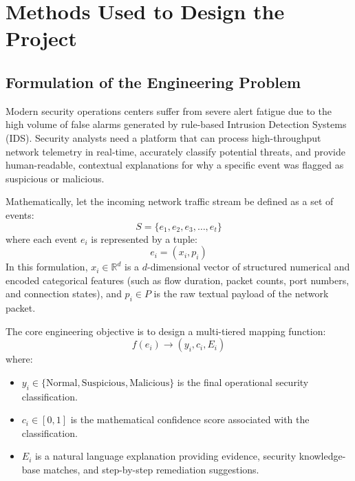 \documentclass[12pt,a4paper]{report}
\begin{document}
\chapter{Methods Used to Design the Project}

\section{Formulation of the Engineering Problem}

Modern security operations centers suffer from severe alert fatigue due to the high volume of false alarms generated by rule-based Intrusion Detection Systems (IDS). Security analysts need a platform that can process high-throughput network telemetry in real-time, accurately classify potential threats, and provide human-readable, contextual explanations for why a specific event was flagged as suspicious or malicious.

Mathematically, let the incoming network traffic stream be defined as a set of events:
\begin{equation}
  S = \{e_1, e_2, e_3, \dots, e_t\}
\end{equation}
where each event $e_i$ is represented by a tuple:
\begin{equation}
  e_i = (x_i, p_i)
\end{equation}
In this formulation, $x_i \in \mathbb{R}^d$ is a $d$-dimensional vector of structured numerical and encoded categorical features (such as flow duration, packet counts, port numbers, and connection states), and $p_i \in P$ is the raw textual payload of the network packet.

The core engineering objective is to design a multi-tiered mapping function:
\begin{equation}
  f(e_i) \to (y_i, c_i, E_i)
\end{equation}
where:
\begin{itemize}[leftmargin=1.5em]
  \item $y_i \in \{\text{Normal}, \text{Suspicious}, \text{Malicious}\}$ is the final operational security classification.
  \item $c_i \in [0, 1]$ is the mathematical confidence score associated with the classification.
  \item $E_i$ is a natural language explanation providing evidence, security knowledge-base matches, and step-by-step remediation suggestions.
\end{itemize}
\end{document}
